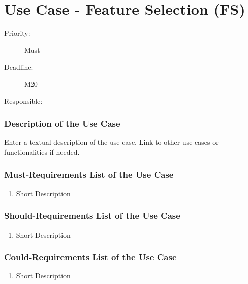 \newpage
\section{Use Case - Feature Selection (FS)}
\label{UseCase:FS}

\begin{description}
\item[Priority:] Must
\item[Deadline:] M20
\item[Responsible:]
\end{description}

\subsubsection*{Description of the Use Case}

Enter a textual description of the use case. Link to other use cases or functionalities if needed. 


\subsubsection*{Must-Requirements List of the Use Case}

\begin{enumerate}
\item Short Description
\end{enumerate}

\subsubsection*{Should-Requirements List of the Use Case}

\begin{enumerate}
\item Short Description
\end{enumerate}

\subsubsection*{Could-Requirements List of the Use Case}

\begin{enumerate}
\item Short Description
\end{enumerate}


